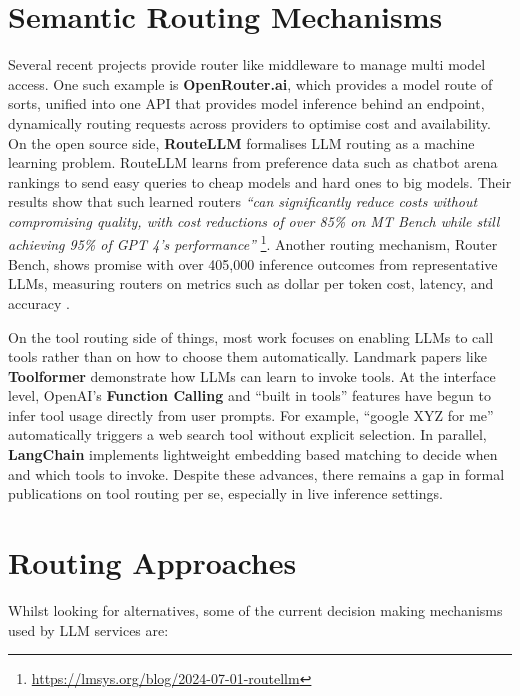 \section{Semantic Routing Mechanisms}

Several recent projects provide router like middleware to manage multi model access. One such example is \textbf{OpenRouter.ai}, which provides a model route of sorts, unified into one API that provides model inference behind an endpoint, dynamically routing requests across providers to optimise cost and availability. On the open source side, \textbf{RouteLLM} formalises LLM routing as a machine learning problem. RouteLLM learns from preference data such as chatbot arena rankings to send easy queries to cheap models and hard ones to big models. Their results show that such learned routers \textit{“can significantly reduce costs without compromising quality, with cost reductions of over 85\% on MT Bench while still achieving 95\% of GPT 4's performance”} \footnote{\url{https://lmsys.org/blog/2024-07-01-routellm}}. Another routing mechanism, Router Bench, shows promise with over 405,000 inference outcomes from representative LLMs, measuring routers on metrics such as dollar per token cost, latency, and accuracy \cite{hu2024routerbenchbenchmarkmultillmrouting}.

On the tool routing side of things, most work focuses on enabling LLMs to call tools rather than on how to choose them automatically. Landmark papers like \textbf{Toolformer} \cite{schick2023toolformerlanguagemodelsteach} demonstrate how LLMs can learn to invoke tools. At the interface level, OpenAI's \textbf{Function Calling} and “built in tools” features have begun to infer tool usage directly from user prompts. For example, “google XYZ for me” automatically triggers a web search tool without explicit selection. In parallel, \textbf{LangChain} implements lightweight embedding based matching to decide when and which tools to invoke. Despite these advances, there remains a gap in formal publications on tool routing per se, especially in live inference settings.

\section{Routing Approaches}

Whilst looking for alternatives, some of the current decision making mechanisms used by LLM services are:

